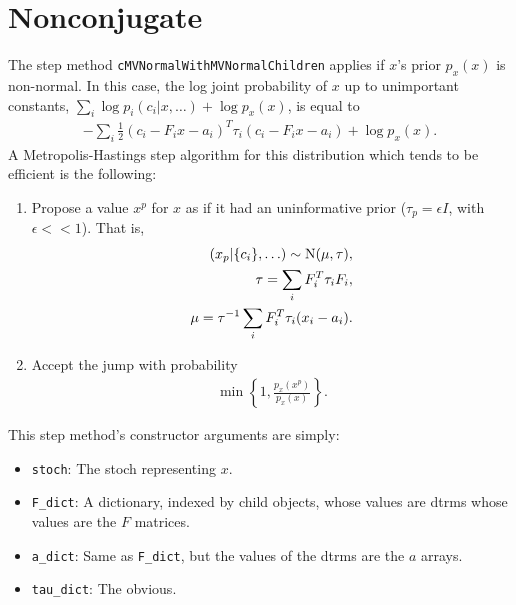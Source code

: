 \documentclass{article}
\begin{document}
\section{Nonconjugate}\label{non}
The step method \texttt{cMVNormalWithMVNormalChildren} applies if $x$'s prior $p_x(x)$ is non-normal. In this case, the log joint probability of $x$ up to unimportant constants, $\sum_i \log p_i(c_i|x,\ldots) + \log p_x(x)$, is equal to
\begin{eqnarray*}
	-\sum_i\frac{1}{2}(c_i-F_ix-a_i)^T\tau_i(c_i-F_ix-a_i) +\log p_x(x).
\end{eqnarray*}
A Metropolis-Hastings step algorithm for this distribution which tends to be efficient is the following:
\begin{enumerate}
	\item Propose a value $x^p$ for $x$ as if it had an uninformative prior ($\tau_p = \epsilon I$, with $\epsilon << 1$). That is,
	\begin{eqnarray*}
		(x_p|\{c_i\},\ldots)\sim\textup{N}(\mu,\tau),\\
		\tau = \sum_i F_i^T \tau_i F_i,\\
		\mu = \tau^{-1}\sum_i F_i^T\tau_i(x_i-a_i).
	\end{eqnarray*}	
	\item Accept the jump with probability
	\begin{eqnarray*}
		\min\left\{1,\frac{p_x(x^p)}{p_x(x)}\right\}.
	\end{eqnarray*}
\end{enumerate}

This step method's constructor arguments are simply:
\begin{itemize}
	\item \texttt{stoch}: The stoch representing $x$. 
	\item \texttt{F\_dict}: A dictionary, indexed by child objects, whose values are dtrms whose values are the $F$ matrices. 
	\item \texttt{a\_dict}: Same as \texttt{F\_dict}, but the values of the dtrms are the $a$ arrays.
	\item \texttt{tau\_dict}: The obvious.
\end{itemize}
\end{document}
